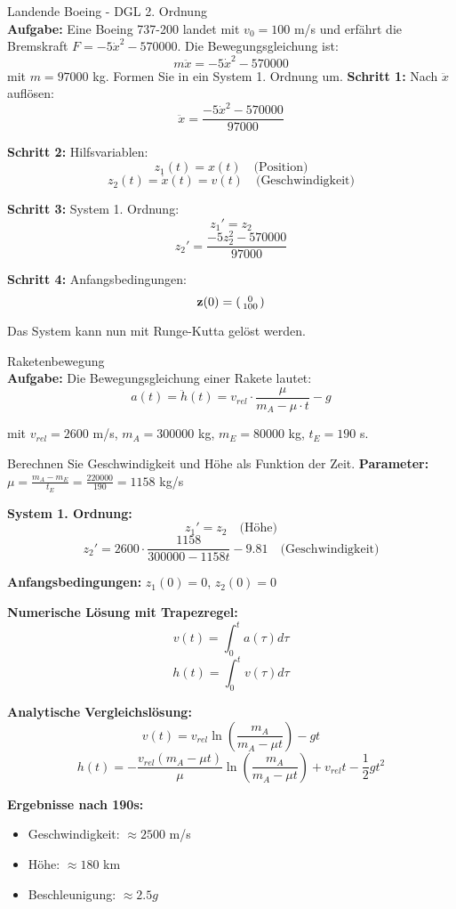 \begin{example2}{Landende Boeing - DGL 2. Ordnung}\\
\textbf{Aufgabe:} Eine Boeing 737-200 landet mit $v_0 = 100$ m/s und erfährt die Bremskraft $F = -5\dot{x}^2 - 570000$. Die Bewegungsgleichung ist:
$$m\ddot{x} = -5\dot{x}^2 - 570000$$
mit $m = 97000$ kg. Formen Sie in ein System 1. Ordnung um.
\tcblower
\textbf{Schritt 1:} Nach $\ddot{x}$ auflösen:
$$\ddot{x} = \frac{-5\dot{x}^2 - 570000}{97000}$$

\textbf{Schritt 2:} Hilfsvariablen:
$$z_1(t) = x(t) \quad \text{(Position)}$$
$$z_2(t) = \dot{x}(t) = v(t) \quad \text{(Geschwindigkeit)}$$

\textbf{Schritt 3:} System 1. Ordnung:
$$z_1' = z_2$$
$$z_2' = \frac{-5z_2^2 - 570000}{97000}$$

\textbf{Schritt 4:} Anfangsbedingungen:
$$\mathbf{z}(0) = \begin{psmallmatrix} 0 \\ 100 \end{psmallmatrix}$$

Das System kann nun mit Runge-Kutta gelöst werden.
\end{example2}

\begin{example2}{Raketenbewegung}\\
\textbf{Aufgabe:} Die Bewegungsgleichung einer Rakete lautet:
$$a(t) = \ddot{h}(t) = v_{rel} \cdot \frac{\mu}{m_A - \mu \cdot t} - g$$

mit $v_{rel} = 2600$ m/s, $m_A = 300000$ kg, $m_E = 80000$ kg, $t_E = 190$ s.

Berechnen Sie Geschwindigkeit und Höhe als Funktion der Zeit.
\tcblower
\textbf{Parameter:} $\mu = \frac{m_A - m_E}{t_E} = \frac{220000}{190} = 1158$ kg/s

\textbf{System 1. Ordnung:}
$$z_1' = z_2 \quad \text{(Höhe)}$$
$$z_2' = 2600 \cdot \frac{1158}{300000 - 1158t} - 9.81 \quad \text{(Geschwindigkeit)}$$

\textbf{Anfangsbedingungen:} $z_1(0) = 0$, $z_2(0) = 0$

\textbf{Numerische Lösung mit Trapezregel:}
$$v(t) = \int_0^t a(\tau) d\tau$$
$$h(t) = \int_0^t v(\tau) d\tau$$

\textbf{Analytische Vergleichslösung:}
$$v(t) = v_{rel} \ln(\frac{m_A}{m_A - \mu t}) - gt$$
$$h(t) = -\frac{v_{rel}(m_A - \mu t)}{\mu} \ln(\frac{m_A}{m_A - \mu t}) + v_{rel} t - \frac{1}{2}gt^2$$

\textbf{Ergebnisse nach 190s:}
\begin{itemize}
    \item Geschwindigkeit: $\approx 2500$ m/s
    \item Höhe: $\approx 180$ km
    \item Beschleunigung: $\approx 2.5g$
\end{itemize}
\end{example2}

